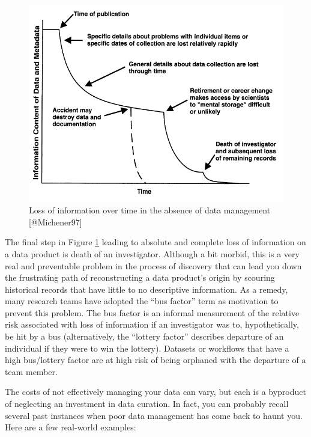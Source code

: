 \documentclass[
]{book}
\begin{document}
\begin{figure}

{\centering \includegraphics[width=1\linewidth]{img/michener} 

}

\caption{Loss of information over time in the absence of data management [@Michener97]}\label{fig:michener}
\end{figure}

The final step in Figure \ref{fig:michener} leading to absolute and complete loss of information on a data product is death of an investigator. Although a bit morbid, this is a very real and preventable problem in the process of discovery that can lead you down the frustrating path of reconstructing a data product's origin by scouring historical records that have little to no descriptive information. As a remedy, many research teams have adopted the ``bus factor'' term as motivation to prevent this problem. The bus factor is an informal measurement of the relative risk associated with loss of information if an investigator was to, hypothetically, be hit by a bus (alternatively, the ``lottery factor'' describes departure of an individual if they were to win the lottery). Datasets or workflows that have a high bus/lottery factor are at high risk of being orphaned with the departure of a team member.

The costs of not effectively managing your data can vary, but each is a byproduct of neglecting an investment in data curation. In fact, you can probably recall several past instances when poor data management has come back to haunt you. Here are a few real-world examples:
\end{document}
